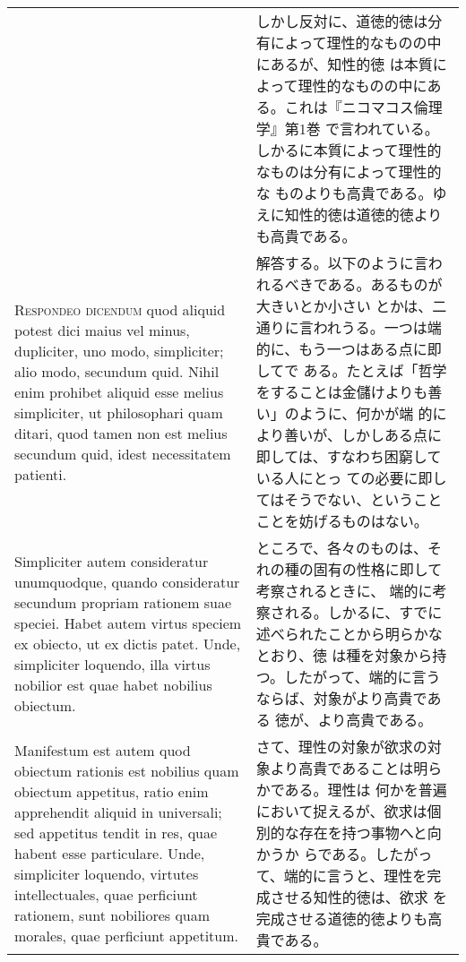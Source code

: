 \documentclass[10pt]{jsarticle}
\begin{document}
\begin{longtable}{p{21em}p{21em}}
&

しかし反対に、道徳的徳は分有によって理性的なものの中にあるが、知性的徳
は本質によって理性的なものの中にある。これは『ニコマコス倫理学』第1巻
で言われている。しかるに本質によって理性的なものは分有によって理性的な
ものよりも高貴である。ゆえに知性的徳は道徳的徳よりも高貴である。

\\


{\scshape Respondeo dicendum} quod aliquid potest dici maius vel
minus, dupliciter, uno modo, simpliciter; alio modo, secundum
quid. Nihil enim prohibet aliquid esse melius simpliciter, ut
philosophari quam ditari, quod tamen non est melius secundum quid,
idest necessitatem patienti.

&

 解答する。以下のように言われるべきである。あるものが大きいとか小さい
 とかは、二通りに言われうる。一つは端的に、もう一つはある点に即してで
 ある。たとえば「哲学をすることは金儲けよりも善い」のように、何かが端
 的により善いが、しかしある点に即しては、すなわち困窮している人にとっ
 ての必要に即してはそうでない、ということことを妨げるものはない。

\\

 Simpliciter autem consideratur unumquodque, quando consideratur
secundum propriam rationem suae speciei. Habet autem virtus speciem ex
obiecto, ut ex dictis patet. Unde, simpliciter loquendo, illa virtus
nobilior est quae habet nobilius obiectum.

&

ところで、各々のものは、それの種の固有の性格に即して考察されるときに、
端的に考察される。しかるに、すでに述べられたことから明らかなとおり、徳
は種を対象から持つ。したがって、端的に言うならば、対象がより高貴である
徳が、より高貴である。

\\

 Manifestum est autem quod obiectum rationis est nobilius quam
obiectum appetitus, ratio enim apprehendit aliquid in universali; sed
appetitus tendit in res, quae habent esse particulare. Unde,
simpliciter loquendo, virtutes intellectuales, quae perficiunt
rationem, sunt nobiliores quam morales, quae perficiunt appetitum.

&

 さて、理性の対象が欲求の対象より高貴であることは明らかである。理性は
 何かを普遍において捉えるが、欲求は個別的な存在を持つ事物へと向かうか
 らである。したがって、端的に言うと、理性を完成させる知性的徳は、欲求
 を完成させる道徳的徳よりも高貴である。


\end{longtable}
\end{document}
